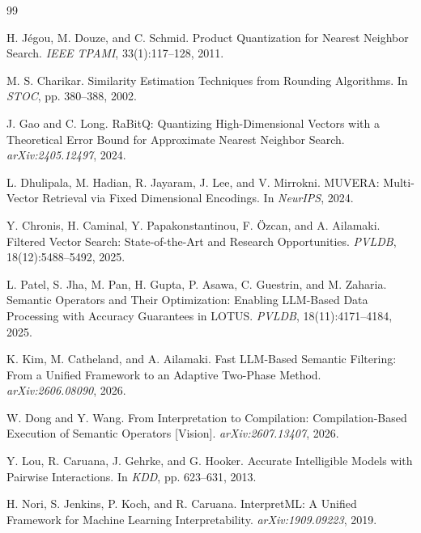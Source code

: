 
\begin{thebibliography}{99}

H. J{\'e}gou, M. Douze, and C. Schmid. Product Quantization for Nearest Neighbor Search. \emph{IEEE TPAMI}, 33(1):117--128, 2011.

M. S. Charikar. Similarity Estimation Techniques from Rounding Algorithms. In \emph{STOC}, pp. 380--388, 2002.

J. Gao and C. Long. RaBitQ: Quantizing High-Dimensional Vectors with a Theoretical Error Bound for Approximate Nearest Neighbor Search. \emph{arXiv:2405.12497}, 2024.

L. Dhulipala, M. Hadian, R. Jayaram, J. Lee, and V. Mirrokni. MUVERA: Multi-Vector Retrieval via Fixed Dimensional Encodings. In \emph{NeurIPS}, 2024.

Y. Chronis, H. Caminal, Y. Papakonstantinou, F. {\"O}zcan, and A. Ailamaki. Filtered Vector Search: State-of-the-Art and Research Opportunities. \emph{PVLDB}, 18(12):5488--5492, 2025.

L. Patel, S. Jha, M. Pan, H. Gupta, P. Asawa, C. Guestrin, and M. Zaharia. Semantic Operators and Their Optimization: Enabling LLM-Based Data Processing with Accuracy Guarantees in LOTUS. \emph{PVLDB}, 18(11):4171--4184, 2025.

K. Kim, M. Catheland, and A. Ailamaki. Fast LLM-Based Semantic Filtering: From a Unified Framework to an Adaptive Two-Phase Method. \emph{arXiv:2606.08090}, 2026.

W. Dong and Y. Wang. From Interpretation to Compilation: Compilation-Based Execution of Semantic Operators [Vision]. \emph{arXiv:2607.13407}, 2026.

Y. Lou, R. Caruana, J. Gehrke, and G. Hooker. Accurate Intelligible Models with Pairwise Interactions. In \emph{KDD}, pp. 623--631, 2013.

H. Nori, S. Jenkins, P. Koch, and R. Caruana. InterpretML: A Unified Framework for Machine Learning Interpretability. \emph{arXiv:1909.09223}, 2019.


\end{thebibliography}
